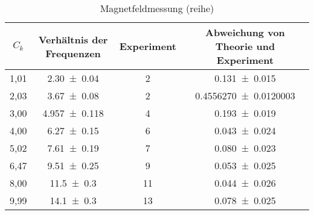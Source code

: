 \begin{table}[H]
    \centering
    \begin{tabular}{c c c c}
        \toprule
        $C_k$    &   Verhältnis der Frequenzen & Experiment & Abweichung von Theorie und Experiment\\
        \midrule
        1,01 & \num{2,30\pm 0,04}     & \num{2}        & \num{0,131\pm 0,015}\\        
        2,03 & \num{3,67\pm 0,08}     & \num{2}        & \num{0,4556270\pm 0,0120003}\\
        3,00 & \num{4,957\pm 0,118}   & \num{4}        & \num{0,193\pm 0,019}\\
        4,00 & \num{6,27\pm 0,15}     & \num{6}        & \num{0,043\pm 0,024}\\
        5,02 & \num{7,61\pm 0,19}     & \num{7}        & \num{0,080\pm 0,023}\\
        6,47 & \num{9,51\pm 0,25}     & \num{9}        & \num{0,053\pm 0,025}\\
        8,00 & \num{11,5\pm 0,3}      & \num{11}       & \num{0,044\pm 0,026}\\       
        9,99 & \num{14,1\pm 0,3}      & \num{13}       & \num{0,078\pm 0,025}\\
       \bottomrule
    \end{tabular}
    \caption{Magnetfeldmessung (reihe)}
    \label{tab:Br}
\end{table}





\label{sec:Auswertung}